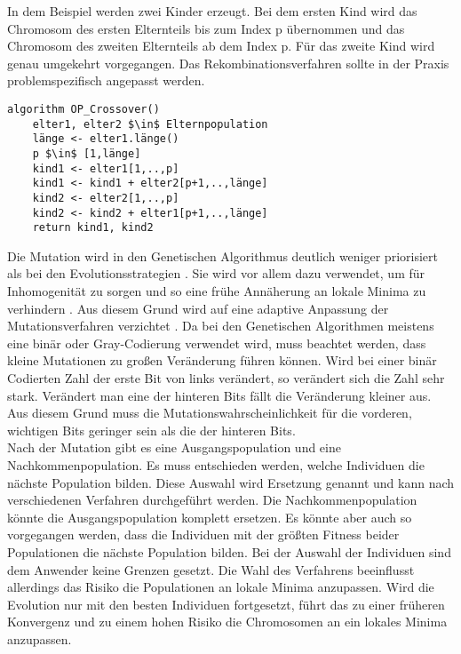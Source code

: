 In dem Beispiel werden zwei Kinder erzeugt. Bei dem ersten Kind wird das Chromosom des ersten Elternteils bis zum Index p übernommen und das Chromosom des zweiten Elternteils ab dem Index p. Für das zweite Kind wird genau umgekehrt vorgegangen. Das Rekombinationsverfahren sollte in der Praxis problemspezifisch angepasst werden.
\begin{lstlisting}[caption={One-Point-Crossover}, firstnumber=1, captionpos=b,label=lst:crossover]
algorithm OP_Crossover()
	elter1, elter2 $\in$ Elternpopulation
	länge <- elter1.länge()
	p $\in$ [1,länge]
	kind1 <- elter1[1,..,p]
	kind1 <- kind1 + elter2[p+1,..,länge]
	kind2 <- elter2[1,..,p]
	kind2 <- kind2 + elter1[p+1,..,länge]
	return kind1, kind2
\end{lstlisting}
Die Mutation wird in den Genetischen Algorithmus deutlich weniger priorisiert als bei den Evolutionsstrategien \cite[S. 200]{schoeneburg}. Sie wird vor allem dazu verwendet, um für Inhomogenität zu sorgen und so eine frühe Annäherung an lokale Minima zu verhindern \cite[S. 200]{schoeneburg}.
Aus diesem Grund wird auf eine adaptive Anpassung der Mutationsverfahren verzichtet \cite[S. 200]{schoeneburg}. Da bei den Genetischen Algorithmen meistens eine binär oder Gray-Codierung verwendet wird, muss beachtet werden, dass kleine Mutationen zu großen Veränderung führen können.
Wird bei einer binär Codierten Zahl der erste Bit von links verändert, so verändert sich die Zahl sehr stark. Verändert man eine der hinteren Bits fällt die Veränderung kleiner aus. Aus diesem Grund muss die Mutationswahrscheinlichkeit für die vorderen, wichtigen Bits geringer sein als die der hinteren Bits.\\
Nach der Mutation gibt es eine Ausgangspopulation und eine Nachkommenpopulation. Es muss entschieden werden, welche Individuen die nächste Population bilden. Diese Auswahl wird Ersetzung genannt und kann nach verschiedenen Verfahren durchgeführt werden.
Die Nachkommenpopulation könnte die Ausgangspopulation komplett ersetzen. Es könnte aber auch so vorgegangen werden, dass die Individuen mit der größten Fitness beider Populationen die nächste Population bilden. Bei der Auswahl der Individuen sind dem Anwender keine Grenzen gesetzt. Die Wahl des Verfahrens beeinflusst allerdings das Risiko die Populationen an lokale Minima anzupassen. Wird die Evolution nur mit den besten Individuen fortgesetzt, führt das zu einer früheren Konvergenz und zu einem hohen Risiko die Chromosomen an ein lokales Minima anzupassen. 

